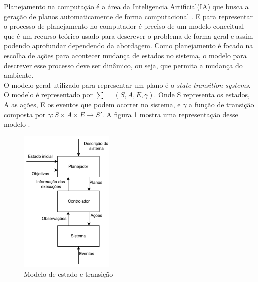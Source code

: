 Planejamento na computação é a área da Inteligencia Artificial(IA) que busca a geração de planos automaticamente de forma computacional \cite{ghallab2004automated}. E para representar o processo de planejamento no computador é preciso de um modelo conceitual que é um recurso teórico usado para descrever o problema de forma geral e assim podendo aprofundar dependendo da abordagem. Como planejamento é  focado na escolha de ações para acontecer mudança de estados no sistema, o modelo para descrever esse processo deve ser dinâmico, ou seja, que permita a mudança do ambiente\cite{ghallab2004automated}. \\

O modelo geral utilizado para representar um plano é o \textit{state-transition systems}. O modelo é representado por $\sum = (S, A, E, \gamma) $. Onde S representa os estados, A as ações, E os eventos que podem ocorrer no sistema, e $\gamma$ a função de transição composta por $ \gamma: S \times A \times E \rightarrow S'$. A figura \ref{fig:planmodelo} mostra uma representação desse modelo \cite{ghallab2004automated}.


\begin{figure}[ht]
	\centering
	\includegraphics[width=0.4\textwidth]{fig/modelo.pdf}
	\caption{Modelo de estado e transição}
	\label{fig:planmodelo}
\end{figure} 

